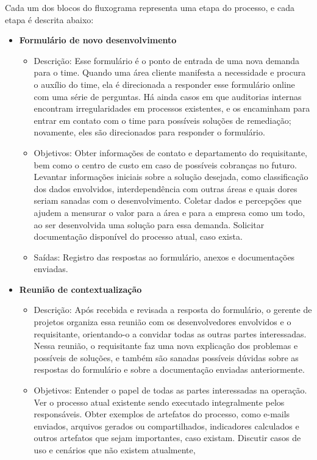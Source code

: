 	Cada um dos blocos do fluxograma representa uma etapa do processo, e cada etapa é descrita abaixo:
	\begin{itemize}
		\item \textbf{Formulário de novo desenvolvimento}
		\begin{itemize}
			\item Descrição: Esse formulário é o ponto de entrada de uma nova demanda para o time. Quando uma área
			cliente manifesta a necessidade e procura o auxílio do time, ela é direcionada a responder esse formulário
			online com uma série de perguntas. Há ainda casos em que auditorias internas encontram irregularidades em processos existentes,
			e os encaminham para entrar em contato com o time para possíveis soluções de remediação; novamente, eles são direcionados para responder o formulário.
			\item Objetivos: Obter informações de contato e departamento do requisitante, bem como o centro de custo em caso de
			possíveis cobranças no futuro. Levantar informações iniciais sobre a solução desejada, como classificação dos dados envolvidos, 
			interdependência com outras áreas e quais dores seriam sanadas com o desenvolvimento.
			Coletar dados e percepções que ajudem a mensurar o valor para a área e para a empresa como um todo, ao ser desenvolvida uma
			solução para essa demanda. Solicitar documentação disponível do processo atual, caso exista.
			\item Saídas: Registro das respostas ao formulário, anexos e documentações enviadas.
		\end{itemize}
		\item \textbf{Reunião de contextualização}
		\begin{itemize}
			\item Descrição: Após recebida e revisada a resposta do formulário, o gerente de projetos organiza essa reunião com os desenvolvedores
			envolvidos e o requisitante, orientando-o a convidar todas as outras partes interessadas. Nessa reunião, o requisitante faz uma nova explicação dos problemas e possíveis
			de soluções, e também são sanadas possíveis dúvidas sobre as respostas do formulário e sobre a documentação enviadas anteriormente.
			\item Objetivos: Entender o papel de todas as partes interessadas na operação. Ver o processo atual existente sendo executado integralmente
			pelos responsáveis. Obter exemplos de artefatos do processo, como e-mails enviados, arquivos gerados ou compartilhados,
			indicadores calculados e outros artefatos que sejam importantes, caso existam. Discutir casos de uso e cenários que não existem atualmente,

\end{itemize}
\end{itemize}
